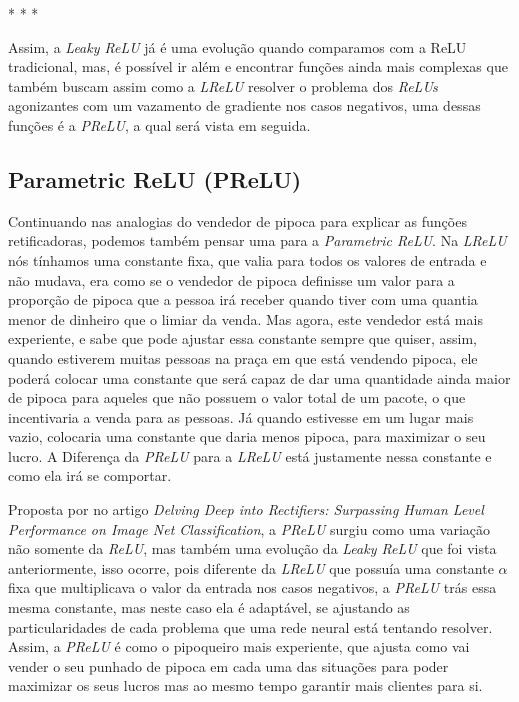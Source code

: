 \medskip
\begin{center}
 * * *
\end{center}
\medskip

Assim, a \textit{Leaky ReLU} já é uma evolução quando comparamos com a ReLU tradicional, mas, é possível ir além e encontrar funções ainda mais complexas que também buscam assim como a \textit{LReLU} resolver o problema dos \textit{ReLUs} agonizantes com um vazamento de gradiente nos casos negativos, uma dessas funções é a \textit{PReLU}, a qual será vista em seguida.

\subsection{Parametric ReLU (PReLU)} 

Continuando nas analogias do vendedor de pipoca para explicar as funções retificadoras, podemos também pensar uma para a \textit{Parametric ReLU}. Na \textit{LReLU} nós tínhamos uma constante fixa, que valia para todos os valores de entrada e não mudava, era como se o vendedor de pipoca definisse um valor para a proporção de pipoca que a pessoa irá receber quando tiver com uma quantia menor de dinheiro que o limiar da venda. Mas agora, este vendedor está mais experiente, e sabe que pode ajustar essa constante sempre que quiser, assim, quando estiverem muitas pessoas na praça em que está vendendo pipoca, ele poderá colocar uma constante que será capaz de dar uma quantidade ainda maior de pipoca para aqueles que não possuem o valor total de um pacote, o que incentivaria a venda para as pessoas. Já quando estivesse em um lugar mais vazio, colocaria uma constante que daria menos pipoca, para maximizar o seu lucro. A Diferença da \textit{PReLU} para a \textit{LReLU} está justamente nessa constante e como ela irá se comportar.

Proposta por \textcite{PReLUArticle} no artigo \textit{Delving Deep into Rectifiers: Surpassing Human Level Performance on Image Net Classification}, a \textit{PReLU} surgiu como uma variação não somente da \textit{ReLU}, mas também uma evolução da \textit{Leaky ReLU} que foi vista anteriormente, isso ocorre, pois diferente da \textit{LReLU} que possuía uma constante $\alpha$ fixa que multiplicava o valor da entrada nos casos negativos, a \textit{PReLU} trás essa mesma constante, mas neste caso ela é adaptável, se ajustando as particularidades de cada problema que uma rede neural está tentando resolver. Assim, a \textit{PReLU} é como o pipoqueiro mais experiente, que ajusta como vai vender o seu punhado de pipoca em cada uma das situações para poder maximizar os seus lucros mas ao mesmo tempo garantir mais clientes para si.

